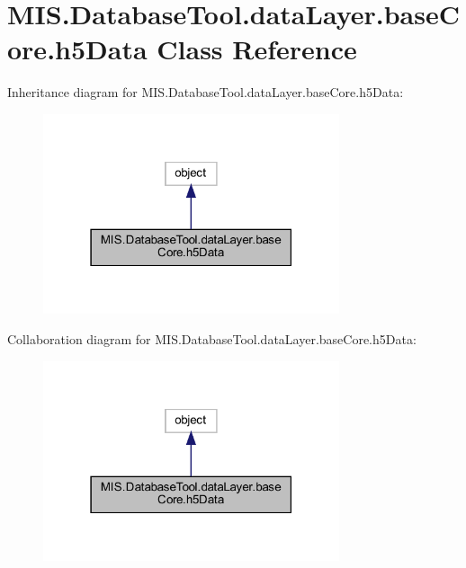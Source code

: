 \hypertarget{classMIS_1_1DatabaseTool_1_1dataLayer_1_1baseCore_1_1h5Data}{}\section{M\+I\+S.\+Database\+Tool.\+data\+Layer.\+base\+Core.\+h5\+Data Class Reference}
\label{classMIS_1_1DatabaseTool_1_1dataLayer_1_1baseCore_1_1h5Data}


Inheritance diagram for M\+I\+S.\+Database\+Tool.\+data\+Layer.\+base\+Core.\+h5\+Data\+:\nopagebreak
\begin{figure}[H]
\begin{center}
\leavevmode
\includegraphics[width=247pt]{classMIS_1_1DatabaseTool_1_1dataLayer_1_1baseCore_1_1h5Data__inherit__graph}
\end{center}
\end{figure}


Collaboration diagram for M\+I\+S.\+Database\+Tool.\+data\+Layer.\+base\+Core.\+h5\+Data\+:\nopagebreak
\begin{figure}[H]
\begin{center}
\leavevmode
\includegraphics[width=247pt]{classMIS_1_1DatabaseTool_1_1dataLayer_1_1baseCore_1_1h5Data__coll__graph}
\end{center}
\end{figure}
